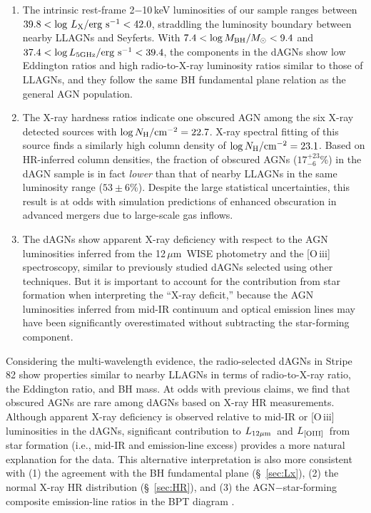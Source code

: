 \documentclass[iop,revtex4,twocolumn,apj,numberedappendix,appendixfloats]{emulateapj}
\newcommand{\um}{$\mu$m}
\newcommand{\lmir}{$L_{\rm 12\mu m}$}
\newcommand{\loiii}{$L_{\rm [OIII]}$}
\begin{document}
\begin{enumerate}

\item The intrinsic rest-frame 2$-$10\,keV luminosities of our sample ranges between $39.8 < \log\,L_{\rm X}/{\rm erg~s}^{-1} < 42.0$, straddling the luminosity boundary between nearby LLAGNs and Seyferts. With $7.4 < \log M_{\rm BH}/M_\odot < 9.4$ and $37.4 < \log L_{\rm 5 GHz}/{\rm erg~s}^{-1} < 39.4$, the components in the dAGNs show low Eddington ratios and high radio-to-X-ray luminosity ratios similar to those of LLAGNs, and they follow the same BH fundamental plane relation as the general AGN population. 

\item The X-ray hardness ratios indicate one obscured AGN among the six X-ray detected sources with $\log N_{\rm H}/{\rm cm}^{-2} = 22.7$. X-ray spectral fitting of this source finds a similarly high column density of $\log N_{\rm H}/{\rm cm}^{-2} = 23.1$. Based on HR-inferred column densities, the fraction of obscured AGNs ($17^{+23}_{-6}$\%) in the dAGN sample is in fact {\it lower} than that of nearby LLAGNs in the same luminosity range ($53\pm6$\%). Despite the large statistical uncertainties, this result is at odds with simulation predictions of enhanced obscuration in advanced mergers due to large-scale gas inflows.

\item The dAGNs show apparent X-ray deficiency with respect to the AGN luminosities inferred from the 12\,\um\ WISE photometry and the [O\,{\sc iii}] spectroscopy, similar to previously studied dAGNs selected using other techniques. But it is important to account for the contribution from star formation when interpreting the ``X-ray deficit,'' because the AGN luminosities inferred from mid-IR continuum and optical emission lines may have been significantly overestimated without subtracting the star-forming component. 

\end{enumerate}

Considering the multi-wavelength evidence, the radio-selected dAGNs in Stripe 82 show properties similar to nearby LLAGNs in terms of radio-to-X-ray ratio, the Eddington ratio, and BH mass. At odds with previous claims, we find that obscured AGNs are rare among dAGNs based on X-ray HR measurements. Although apparent X-ray deficiency is observed relative to mid-IR or [O\,{\sc iii}] luminosities in the dAGNs, significant contribution to \lmir\ and \loiii\ from star formation (i.e., mid-IR and emission-line excess) provides a more natural explanation for the data. This alternative interpretation is also more consistent with (1) the agreement with the BH fundamental plane (\S~\ref{sec:Lx}), (2) the normal X-ray HR distribution (\S~\ref{sec:HR}), and (3) the AGN$-$star-forming composite emission-line ratios in the BPT diagram .
\end{document}
